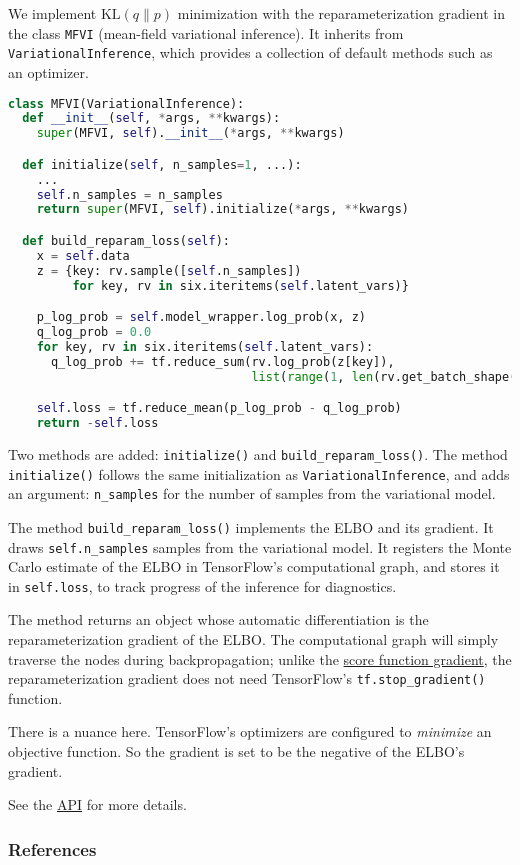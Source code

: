 We implement $\text{KL}(q\|p)$ minimization with the
reparameterization gradient in the class \texttt{MFVI} (mean-field
variational inference). It inherits from
\texttt{VariationalInference}, which
provides a collection of default methods
such as an optimizer.

\begin{lstlisting}[language=Python]
class MFVI(VariationalInference):
  def __init__(self, *args, **kwargs):
    super(MFVI, self).__init__(*args, **kwargs)

  def initialize(self, n_samples=1, ...):
    ...
    self.n_samples = n_samples
    return super(MFVI, self).initialize(*args, **kwargs)

  def build_reparam_loss(self):
    x = self.data
    z = {key: rv.sample([self.n_samples])
         for key, rv in six.iteritems(self.latent_vars)}

    p_log_prob = self.model_wrapper.log_prob(x, z)
    q_log_prob = 0.0
    for key, rv in six.iteritems(self.latent_vars):
      q_log_prob += tf.reduce_sum(rv.log_prob(z[key]),
                                  list(range(1, len(rv.get_batch_shape()) + 1)))

    self.loss = tf.reduce_mean(p_log_prob - q_log_prob)
    return -self.loss
\end{lstlisting}

Two methods are added: \texttt{initialize()} and
\texttt{build_reparam_loss()}. The method \texttt{initialize()}
follows the same initialization as \texttt{VariationalInference}, and
adds an argument: \texttt{n_samples} for the number of samples from
the variational model.

The method \texttt{build_reparam_loss()} implements the ELBO and its
gradient. It draws \texttt{self.n_samples} samples from the
variational model. It registers the Monte Carlo
estimate of the ELBO in TensorFlow's computational graph, and stores it
in \texttt{self.loss}, to track progress of the inference for diagnostics.

The method returns an object whose automatic differentiation is the
reparameterization gradient of the ELBO. The computational graph will
simply traverse the nodes during backpropagation; unlike the
\href{/tutorials/klqp-score}{score function gradient}, the
reparameterization gradient does not need TensorFlow's
\texttt{tf.stop_gradient()} function.

There is a nuance here. TensorFlow's optimizers are configured to
\emph{minimize} an objective function. So the gradient is set to be
the negative of the ELBO's gradient.

See the \href{/api/}{API} for more details.

\subsubsection{References}\label{references}

